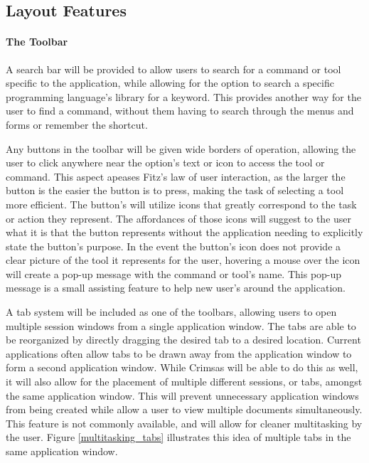 \documentclass[11pt, oneside]{article}
\begin{document}
\subsection{Layout Features}
\paragraph{The Toolbar}
A search bar will be provided to allow users to search for a command or tool specific to the application, while allowing for the option to search a specific programming language's library for a keyword. This provides another way for the user to find a command, without them having to search through the menus and forms or remember the shortcut. 

Any buttons in the toolbar will be given wide borders of operation, allowing the user to click anywhere near the option's text or icon to access the tool or command. This aspect apeases Fitz's law of user interaction, as the larger the button is the easier the button is to press, making the task of selecting a tool more efficient. The button's will utilize icons that greatly correspond to the task or action they represent. The affordances of those icons will suggest to the user what it is that the button represents without the application needing to explicitly state the button's purpose. In the event the button's icon does not provide a clear picture of the tool it represents for the user, hovering a mouse over the icon will create a pop-up message with the command or tool's name. This pop-up message is a small assisting feature to help new user's around the application.

A tab system will be included as one of the toolbars, allowing users to open multiple session windows from a single application window. The tabs are able to be reorganized by directly dragging the desired tab to a desired location. Current applications often allow tabs to be drawn away from the application window to form a second application window. While Crimsas will be able to do this as well, it will also allow for the placement of multiple different sessions, or tabs, amongst the same application window. This will prevent unnecessary application windows from being created while allow a user to view multiple documents simultaneously. This feature is not commonly available, and will allow for cleaner multitasking by the user. Figure \ref{multitasking_tabs} illustrates this idea of multiple tabs in the same application window.
\end{document}
